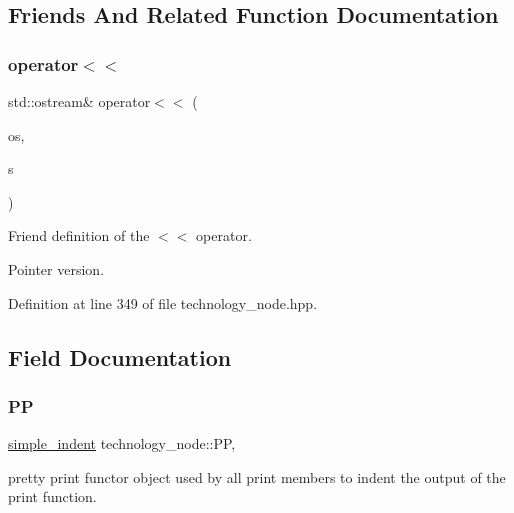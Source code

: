 \subsection{Friends And Related Function Documentation}
\mbox{\label{structtechnology__node_a4ec81768b4a21484c4deed5c77d4bd8e}} 
\subsubsection{\texorpdfstring{operator$<$$<$}{operator<<}}
{\footnotesize\ttfamily std\+::ostream\& operator$<$$<$ (\begin{DoxyParamCaption}\item[{std\+::ostream \&}]{os,  }\item[{const \hyperlink{technology__node_8hpp_a33dd193b7bd6b987bf0d8a770a819fa7}{technology\+\_\+node\+Ref} \&}]{s }\end{DoxyParamCaption})\hspace{0.3cm}{\ttfamily [friend]}}



Friend definition of the $<$$<$ operator. 

Pointer version. 

Definition at line 349 of file technology\+\_\+node.\+hpp.



\subsection{Field Documentation}
\mbox{\label{structtechnology__node_ae6edfff0ccd2700b5de9fb538536977a}} 
\subsubsection{\texorpdfstring{PP}{PP}}
{\footnotesize\ttfamily \hyperlink{classsimple__indent}{simple\+\_\+indent} technology\+\_\+node\+::\+PP\hspace{0.3cm}{\ttfamily [static]}, {\ttfamily [protected]}}



pretty print functor object used by all print members to indent the output of the print function. 

